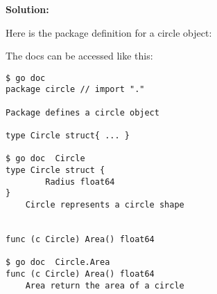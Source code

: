 \textbf{Solution:}

Here is the package definition for a circle object:



The docs can be accessed like this:

\begin{lstlisting}[numbers=none]
$ go doc
package circle // import "."

Package defines a circle object

type Circle struct{ ... }

$ go doc  Circle
type Circle struct {
        Radius float64
}
    Circle represents a circle shape


func (c Circle) Area() float64

$ go doc  Circle.Area
func (c Circle) Area() float64
    Area return the area of a circle
\end{lstlisting}
